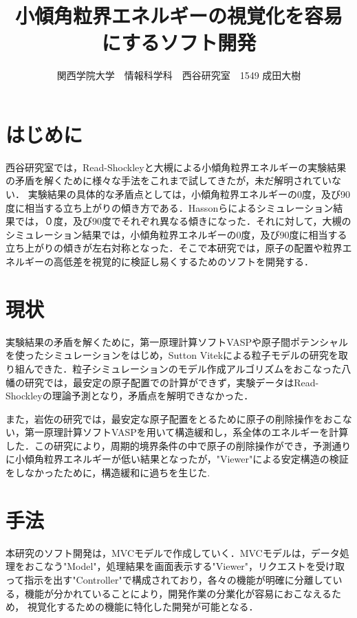 \documentclass[a4j,twocolumn]{jsarticle}
\begin{document}
\title{小傾角粒界エネルギーの視覚化を容易にするソフト開発}
\author{関西学院大学　情報科学科　西谷研究室　1549 成田大樹}
\date{}
\maketitle

\section{はじめに}
西谷研究室では，Read-Shockleyと大槻による小傾角粒界エネルギーの実験結果の矛盾を解くために様々な手法をこれまで試してきたが，未だ解明されていない．
実験結果の具体的な矛盾点としては，小傾角粒界エネルギーの0度，及び90度に相当する立ち上がりの傾き方である．Hassonらによるシミュレーション結果では，０度，及び90度でそれぞれ異なる傾きになった．それに対して，大槻のシミュレーション結果では，小傾角粒界エネルギーの0度，及び90度に相当する立ち上がりの傾きが左右対称となった．そこで本研究では，原子の配置や粒界エネルギーの高低差を視覚的に検証し易くするためのソフトを開発する．

\section{現状}
実験結果の矛盾を解くために，第一原理計算ソフトVASPや原子間ポテンシャルを使ったシミュレーションをはじめ，Sutton Vitekによる粒子モデルの研究を取り組んできた．粒子シミュレーションのモデル作成アルゴリズムをおこなった八幡の研究では，最安定の原子配置での計算ができず，実験データはRead-Shockleyの理論予測となり，矛盾点を解明できなかった\cite{yahata}．

また，岩佐の研究では，最安定な原子配置をとるために原子の削除操作をおこない，第一原理計算ソフトVASPを用いて構造緩和し，系全体のエネルギーを計算した．この研究により，周期的境界条件の中で原子の削除操作ができ，予測通りに小傾角粒界エネルギーが低い結果となったが，"Viewer"による安定構造の検証をしなかったために，構造緩和に過ちを生じた\cite{iwasa}.

\section{手法}
本研究のソフト開発は，MVCモデルで作成していく．MVCモデルは，データ処理をおこなう"Model"，処理結果を画面表示する"Viewer"，リクエストを受け取って指示を出す"Controller"で構成されており，各々の機能が明確に分離している，機能が分かれていることにより，開発作業の分業化が容易におこなえるため， 視覚化するための機能に特化した開発が可能となる．
\end{document}
